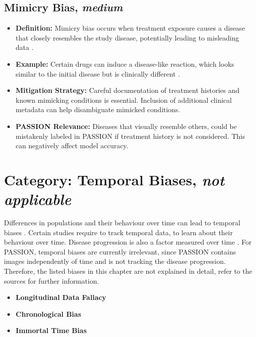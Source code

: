 \documentclass[12pt, a4paper, oneside]{book}   	%
\begin{document}
\begin{appendices}
		\subsection{Mimicry Bias, \textit{medium}}
		\begin{itemize}
			\item \textbf{Definition:} Mimicry bias occurs when treatment exposure causes a disease that closely resembles the study disease, potentially leading to misleading data \autocite{Chakraborty_2024}.
			\item \textbf{Example:} Certain drugs can induce a disease-like reaction, which looks similar to the initial disease but is clinically different  \autocite{Chakraborty_2024}.
			\item \textbf{Mitigation Strategy:} Careful documentation of treatment histories and known mimicking conditions is essential. Inclusion of additional clinical metadata can help disambiguate mimicked conditions.
			\item \textbf{PASSION Relevance:} Diseases that visually resemble others, could be mistakenly labeled in PASSION if treatment history is not considered. This can negatively affect model accuracy.
		\end{itemize}
		
		\section{Category: Temporal Biases, \textit{not applicable}} \label{app:biasCategoryTemporalBiasesNA}
		Differences in populations and their behaviour over time can lead to temporal biases \autocite{M120_Olteanu_2019}. Certain studies require to track temporal data, to learn about their behaviour over time. Disease progression is also a factor measured over time \autocite{Mehrabi_2021}. For PASSION, temporal biases are currently irrelevant, since PASSION contains images independently of time and is not tracking the disease progression. Therefore, the listed biases in this chapter are not explained in detail, refer to the sources for further information.
		
		\begin{itemize}
			\item \textbf{Longitudinal Data Fallacy} \autocite{Mehrabi_2021}
			\item \textbf{Chronological Bias} \autocite{Chakraborty_2024}
			\item \textbf{Immortal Time Bias} \autocite{Chakraborty_2024}
		\end{itemize}
		

\end{appendices}
\end{document}
